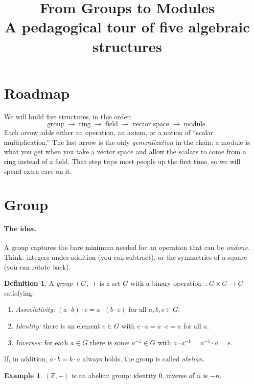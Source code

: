\documentclass[11pt]{article}
\title{From Groups to Modules\\[2pt]
\large A pedagogical tour of five algebraic structures}
\author{}
\date{}
\theoremstyle{definition}
\newtheorem*{defn}{Definition}
\newtheorem*{ex}{Example}
\begin{document}
\maketitle

\section*{Roadmap}

We will build five structures, in this order:
\[
\text{group} \;\longrightarrow\; \text{ring} \;\longrightarrow\; \text{field}
\;\longrightarrow\; \text{vector space} \;\longrightarrow\; \text{module}.
\]
Each arrow adds either an operation, an axiom, or a notion of ``scalar multiplication.''
The last arrow is the only \emph{generalization} in the chain: a module is what you
get when you take a vector space and allow the scalars to come from a ring instead
of a field. That step trips most people up the first time, so we will spend extra
care on it.

\section{Group}

\paragraph{The idea.}
A group captures the bare minimum needed for an operation that can be \emph{undone}.
Think: integers under addition (you can subtract), or the symmetries of a square
(you can rotate back).

\begin{defn}
A \emph{group} $(G,\cdot)$ is a set $G$ with a binary operation
$\cdot : G \times G \to G$ satisfying:
\begin{enumerate}[label=(G\arabic*), leftmargin=3em]
  \item \emph{Associativity:} $(a\cdot b)\cdot c = a\cdot(b\cdot c)$ for all $a,b,c\in G$.
  \item \emph{Identity:} there is an element $e\in G$ with $e\cdot a = a\cdot e = a$ for all $a$.
  \item \emph{Inverses:} for each $a\in G$ there is some $a^{-1}\in G$ with $a\cdot a^{-1} = a^{-1}\cdot a = e$.
\end{enumerate}
If, in addition, $a\cdot b = b\cdot a$ always holds, the group is called \emph{abelian}.
\end{defn}

\begin{ex}
$(\mathbb{Z},+)$ is an abelian group: identity $0$, inverse of $n$ is $-n$.
\end{ex}
\end{document}
